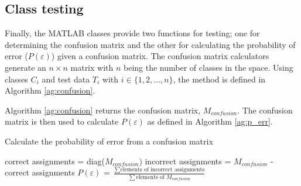 \subsection{Class testing}
Finally, the MATLAB classes provide two functions for testing; one for
determining the confusion matrix and the other for calculating the probability
of error ($P(\varepsilon)$) given a confusion matrix. The confusion matrix
calculators generate an $n \times n$ matrix with $n$ being the number of
classes in the space. Using classes $C_i$ and test data $T_i$ with $i \in
\{1,2, \ldots, n\}$, the method is defined in Algorithm \ref{ag:confusion}.

Algorithm \ref{ag:confusion} returns the confusion matrix, $M_{confusion}$. The confusion
matrix is then used to calculate $P(\varepsilon)$ as defined in Algorithm
\ref{ag:p_err}.

\begin{algorithm}
\caption{Calculate the probability of error from a confusion matrix}
\label{ag:p_err}
\begin{algorithmic}
\STATE correct assignments = diag($M_{confusion}$)
\STATE incorrect assignments = $M_{confusion}$ - correct assignments
\STATE $P(\varepsilon)$ = $\frac{\sum \text{elements of incorrect
assignments}}{\sum \text{elements of } M_{confusion}}$
\end{algorithmic}
\end{algorithm}
